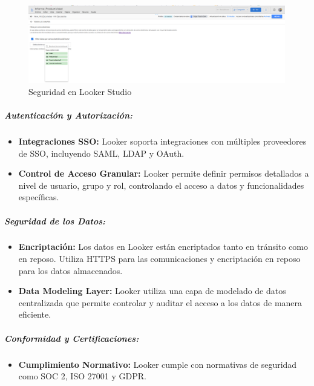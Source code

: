 \documentclass[
  11pt,
  bookmarksnumbered]{article}
\providecommand{\tightlist}{%
  \setlength{\itemsep}{0pt}\setlength{\parskip}{0pt}}
\begin{document}
\begin{figure}

{\centering \includegraphics[width=4.8in]{media 2/image16} 

}

\caption{Seguridad en Looker Studio}\label{fig:unnamed-chunk-20}
\end{figure}

\hypertarget{autenticaciuxf3n-y-autorizaciuxf3n-1}{%
\subparagraph{Autenticación y Autorización:}\label{autenticaciuxf3n-y-autorizaciuxf3n-1}}

\begin{itemize}
\item
  \textbf{Integraciones SSO:} Looker soporta integraciones con múltiples proveedores de SSO, incluyendo SAML, LDAP y OAuth.
\item
  \textbf{Control de Acceso Granular:} Looker permite definir permisos detallados a nivel de usuario, grupo y rol, controlando el acceso a datos y funcionalidades específicas.
\end{itemize}

\hypertarget{seguridad-de-los-datos-1}{%
\subparagraph{Seguridad de los Datos:}\label{seguridad-de-los-datos-1}}

\begin{itemize}
\item
  \textbf{Encriptación:} Los datos en Looker están encriptados tanto en tránsito como en reposo.
  Utiliza HTTPS para las comunicaciones y encriptación en reposo para los datos almacenados.
\item
  \textbf{Data Modeling Layer:} Looker utiliza una capa de modelado de datos centralizada que permite controlar y auditar el acceso a los datos de manera eficiente.
\end{itemize}

\hypertarget{conformidad-y-certificaciones-1}{%
\subparagraph{Conformidad y Certificaciones:}\label{conformidad-y-certificaciones-1}}

\begin{itemize}
\tightlist
\item
  \textbf{Cumplimiento Normativo:} Looker cumple con normativas de seguridad como SOC 2, ISO 27001 y GDPR.
\end{itemize}
\end{document}
